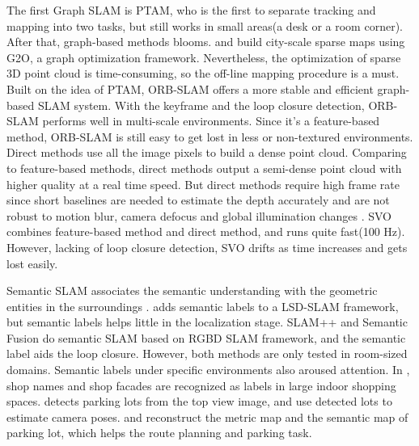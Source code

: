 \documentclass[journal]{IEEEtran}
\begin{document}
The first Graph SLAM is PTAM\cite{Klein2007Parallel}, who is the first to separate tracking and mapping into two tasks, but still works in small areas(a desk or a room corner). 
After that, graph-based methods blooms.\cite{Lategahn2012City} and \cite{Lategahn2014Vision} build city-scale sparse maps using G2O, a graph optimization framework. 
Nevertheless, the optimization of sparse 3D point cloud is time-consuming, so the off-line mapping procedure is a must. Built on the idea of PTAM\cite{Klein2007Parallel}, ORB-SLAM \cite{Mur2017ORB} offers a more stable and efficient graph-based SLAM system. 
With the keyframe and the loop closure detection, ORB-SLAM performs well in multi-scale environments. 
Since it’s a feature-based method, ORB-SLAM is still easy to get lost in less or non-textured environments. 
Direct methods use all the image pixels to build a dense point cloud. 
Comparing to feature-based methods, direct methods output a semi-dense point cloud with higher quality at a real time speed. 
But direct methods require high frame rate since short baselines are needed to estimate the depth accurately \cite{Engel2014LSD} and are not robust to motion blur, camera defocus and global illumination changes \cite{Newcombe2011DTAM}. 
SVO \cite{Forster2013SVO} combines feature-based method and direct method, and runs quite fast(100 Hz). 
However, lacking of loop closure detection, SVO drifts as time increases and gets lost easily.
	

Semantic SLAM associates the semantic understanding with the geometric entities in the surroundings \cite{Cadena:2016fp}. \cite{Li2016Semi} adds semantic labels to a LSD-SLAM framework, but semantic labels helps little in the localization stage. 
SLAM++ \cite{Salas2013SLAM} and Semantic Fusion \cite{Mccormac2017SemanticFusion} do semantic SLAM based on RGBD SLAM framework, and the semantic label aids the loop closure. 
However, both methods are only tested in room-sized domains. Semantic labels under specific environments also aroused attention. 
In \cite{Wang2015Lost}, shop names and shop facades are recognized as labels in large indoor shopping spaces. 
\cite{Houben:2015hq} detects parking lots from the top view image, and use detected lots to estimate camera poses. 
\cite{Grimmett2015Integrating} and \cite{Himstedt2017Online} reconstruct the metric map and the semantic map of parking lot, which helps the route planning and parking task.

\end{document}

